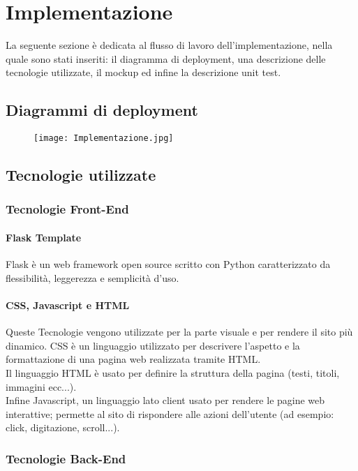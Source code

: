 \documentclass[11pt,a4paper]{report}
\begin{document}
\chapter{Implementazione}
La seguente sezione è dedicata al flusso di lavoro dell'implementazione, nella quale sono stati inseriti: il diagramma di deployment, una descrizione delle tecnologie utilizzate, 
il mockup ed infine la descrizione unit test. 
\section{Diagrammi di deployment}
\begin{figure}[h!]
  \centering
  \texttt{[image: Implementazione.jpg]}
\end{figure}
\newpage

\section{Tecnologie utilizzate}
\subsection{Tecnologie Front-End}
\subsubsection{Flask Template}
Flask è un web framework open source scritto con Python caratterizzato da flessibilità, leggerezza e semplicità d'uso.\\
\subsubsection{CSS, Javascript e HTML}
Queste Tecnologie vengono utilizzate per la parte visuale e per rendere il sito più dinamico. CSS è un linguaggio utilizzato per descrivere
l'aspetto e la formattazione di una pagina web realizzata tramite HTML.\\
Il linguaggio HTML è usato per definire la struttura della pagina (testi, titoli, immagini ecc...).\\
Infine Javascript, un linguaggio lato client usato per rendere le pagine web interattive; permette al sito di rispondere alle azioni dell'utente (ad esempio: click, digitazione, scroll...). 
\subsection{Tecnologie Back-End}
\end{document}

